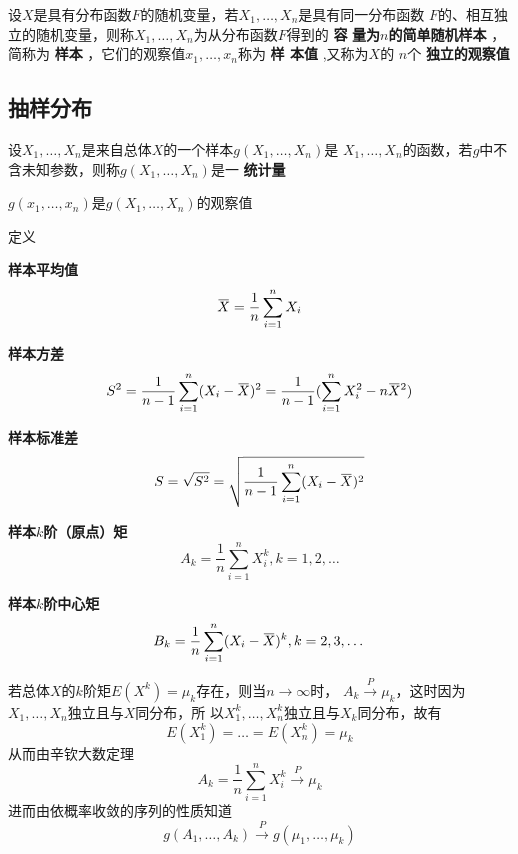 \documentclass[11pt]{article}
\begin{document}
\begin{definition}[]
设\(X\)是具有分布函数\(F\)的随机变量，若\(X_1,\dots,X_n\)是具有同一分布函数
\(F\)的、相互独立的随机变量，则称\(X_1,\dots,X_n\)为从分布函数\(F\)得到的 \textbf{容}
\textbf{量为\(n\)的简单随机样本} ，简称为 \textbf{样本} ，它们的观察值\(x_1,\dots,x_n\)称为 \textbf{样
本值} ,又称为\(X\)的 \(n\)个 \textbf{独立的观察值}
\end{definition}
\subsection{抽样分布}
\label{sec:orgf66573f}
\begin{definition}[]
设\(X_1,\dots,X_n\)是来自总体\(X\)的一个样本\(g(X_1,\dots,X_n)\)是
\(X_1,\dots,X_n\)的函数，若\(g\)中不含未知参数，则称\(g(X_1,\dots,X_n)\)是一
\textbf{统计量}
\end{definition}

\(g(x_1,\dots,x_n)\)是\(g(X_1,\dots,X_n)\)的观察值

定义

\textbf{样本平均值}
\begin{equation*}
\bbar{X}=\frac{1}{n}\sum_{i=1}^nX_i
\end{equation*}

\textbf{样本方差}
\begin{equation*}
S^2=\frac{1}{n-1}\sum_{i=1}^n(X_i-\bbar{X})^2=\frac{1}{n-1}
(\sum_{i=1}^nX_i^2-n\bbar{X}^2)
\end{equation*}

\textbf{样本标准差}
\begin{equation*}
S=\sqrt{S^2}=\sqrt{\frac{1}{n-1}\sum_{i=1}^n(X_i-\bbar{X})^2}
\end{equation*}

\textbf{样本\(k\)阶（原点）矩}
\begin{equation*}
A_k=\frac{1}{n}\sum_{i=1}^nX_i^k,k=1,2,\dots
\end{equation*}

\textbf{样本\(k\)阶中心矩}
\begin{equation*}
B_k=\frac{1}{n}\sum_{i=1}^n(X_i-\bbar{X})^k,k=2,3,\dots
\end{equation*}

若总体\(X\)的\(k\)阶矩\(E(X^k)=\mu_k\)存在，则当\(n\to\infty\)时，
\(A_k\xrightarrow{P}\mu_k\)，这时因为\(X_1,\dots,X_n\)独立且与\(X\)同分布，所
以\(X_1^k,\dots,X_n^k\)独立且与\(X_k\)同分布，故有
\begin{equation*}
E(X_1^k)=\dots=E(X_n^k)=\mu_k
\end{equation*}
从而由辛钦大数定理
\begin{equation*}
A_k=\frac{1}{n}\sum_{i=1}^nX_i^k\xrightarrow{P}\mu_k
\end{equation*}
进而由依概率收敛的序列的性质知道
\begin{equation*}
g(A_1,\dots,A_k)\xrightarrow{P}g(\mu_1,\dots,\mu_k)
\end{equation*}
\end{document}
